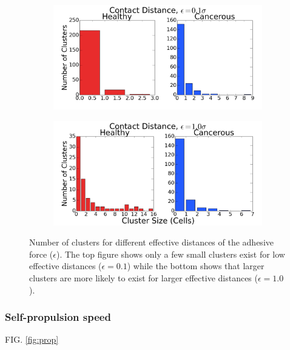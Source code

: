 \documentclass[aps,prb,twocolumn,groupedaddress,nofootinbib,floatfix]{revtex4}
\begin{document}
\begin{figure}
  \begin{subfigure}{\columnwidth}
    \includegraphics[width=1.0\columnwidth]{images/contact1.png}
  \end{subfigure}
  \begin{subfigure}{\columnwidth}
    \includegraphics[width=1.0\columnwidth]{images/contact2.png}
  \end{subfigure}
  \caption{Number of clusters for different effective distances of the adhesive force ($\epsilon$). The top figure shows only a few small clusters exist for low effective distances ($\epsilon=0.1$) while the bottom shows that larger clusters are more likely to exist for larger effective distances ($\epsilon=1.0$).}
  \label{fig:contact}
\end{figure}


\subsubsection{Self-propulsion speed}

FIG. \ref{fig:prop}
\end{document}
